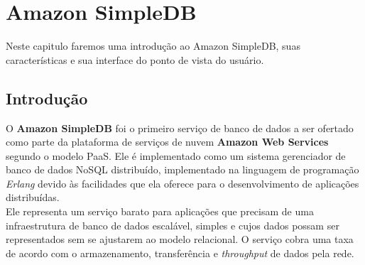 \chapter{Amazon SimpleDB}
Neste capitulo faremos uma introdução ao Amazon SimpleDB, suas características e sua interface do ponto de vista do usuário.

\section{Introdução}
O \textbf{Amazon SimpleDB} foi o primeiro serviço de banco de dados a ser ofertado como parte da plataforma de serviços de nuvem \textbf{Amazon Web Services} segundo o modelo PaaS. Ele é implementado como um sistema gerenciador de banco de dados NoSQL distribuído, implementado na linguagem de programação \textit{Erlang} devido às facilidades que ela oferece para o desenvolvimento de aplicações distribuídas. 
\\ Ele representa um serviço barato para aplicações que precisam de uma infraestrutura de banco de dados escalável, simples e cujos dados possam ser representados sem se ajustarem ao modelo relacional. O serviço cobra uma taxa de acordo com o armazenamento, transferência e \textit{throughput} de dados pela rede.
